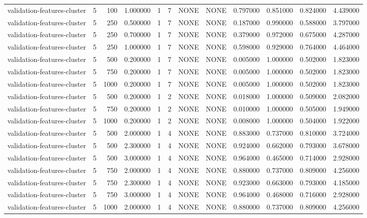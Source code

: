 \begin{tabular}{lrrrllllrrrr}
validation-features-cluster & 5 & 100 & 1.000000 & 1 & 7 & NONE & NONE & 0.797000 & 0.851000 & 0.824000 & 4.439000 \\
validation-features-cluster & 5 & 250 & 0.500000 & 1 & 7 & NONE & NONE & 0.187000 & 0.990000 & 0.588000 & 3.797000 \\
validation-features-cluster & 5 & 250 & 0.700000 & 1 & 7 & NONE & NONE & 0.379000 & 0.972000 & 0.675000 & 4.287000 \\
validation-features-cluster & 5 & 250 & 1.000000 & 1 & 7 & NONE & NONE & 0.598000 & 0.929000 & 0.764000 & 4.464000 \\
validation-features-cluster & 5 & 500 & 0.200000 & 1 & 7 & NONE & NONE & 0.005000 & 1.000000 & 0.502000 & 1.823000 \\
validation-features-cluster & 5 & 750 & 0.200000 & 1 & 7 & NONE & NONE & 0.005000 & 1.000000 & 0.502000 & 1.823000 \\
validation-features-cluster & 5 & 1000 & 0.200000 & 1 & 7 & NONE & NONE & 0.005000 & 1.000000 & 0.502000 & 1.823000 \\
validation-features-cluster & 5 & 500 & 0.200000 & 1 & 2 & NONE & NONE & 0.018000 & 1.000000 & 0.509000 & 2.082000 \\
validation-features-cluster & 5 & 750 & 0.200000 & 1 & 2 & NONE & NONE & 0.010000 & 1.000000 & 0.505000 & 1.949000 \\
validation-features-cluster & 5 & 1000 & 0.200000 & 1 & 2 & NONE & NONE & 0.008000 & 1.000000 & 0.504000 & 1.922000 \\
validation-features-cluster & 5 & 500 & 2.000000 & 1 & 4 & NONE & NONE & 0.883000 & 0.737000 & 0.810000 & 3.724000 \\
validation-features-cluster & 5 & 500 & 2.300000 & 1 & 4 & NONE & NONE & 0.924000 & 0.662000 & 0.793000 & 3.678000 \\
validation-features-cluster & 5 & 500 & 3.000000 & 1 & 4 & NONE & NONE & 0.964000 & 0.465000 & 0.714000 & 2.928000 \\
validation-features-cluster & 5 & 750 & 2.000000 & 1 & 4 & NONE & NONE & 0.880000 & 0.737000 & 0.809000 & 4.256000 \\
validation-features-cluster & 5 & 750 & 2.300000 & 1 & 4 & NONE & NONE & 0.923000 & 0.663000 & 0.793000 & 4.185000 \\
validation-features-cluster & 5 & 750 & 3.000000 & 1 & 4 & NONE & NONE & 0.964000 & 0.468000 & 0.716000 & 2.928000 \\
validation-features-cluster & 5 & 1000 & 2.000000 & 1 & 4 & NONE & NONE & 0.880000 & 0.737000 & 0.809000 & 4.256000 \\

\end{tabular}
